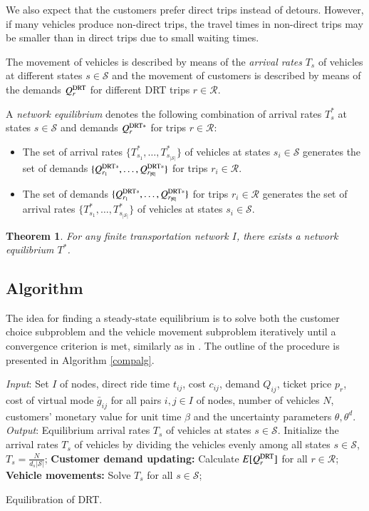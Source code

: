 \documentclass[dissertation,draft*]{aaltoseries}
\newtheorem{theorem}{Theorem}
\begin{document}
We also expect that the customers prefer direct trips instead of detours.
However, if many vehicles produce non-direct trips, 
the travel times in non-direct trips may be smaller than in direct trips due 
to small waiting times.

The movement of vehicles is described by means of the \emph{arrival rates} $T_s$ 
of vehicles at different states $s \in \mathcal{S}$ and
the movement of customers is described by means of the demands $Q^{\rm DRT}_r$ 
for different DRT trips $r \in \mathcal{R}$. 

A \emph{network equilibrium} denotes the following combination of
arrival rates $T_s^*$ at states $s \in \mathcal{S}$ and demands $Q_r^{{\rm DRT}*}$ for trips $r \in \mathcal{R}$: 
\begin{itemize}
\item
The set of arrival rates $\{T_{s_1}^*,\ldots,T_{s_{|\mathcal{S}|}}^*\}$ of vehicles at states $s_i \in \mathcal{S}$ 
generates the set of demands $\{Q_{r_1}^{{\rm DRT}*},\ldots,Q_{r_{|\mathcal{R}|}}^{{\rm DRT}*}\}$ for trips $r_i \in \mathcal{R}$.
\item
The set of demands $\{Q_{r_1}^{{\rm DRT}*},\ldots,Q_{r_{|\mathcal{R}|}}^{{\rm DRT}*}\}$ for trips $r_i \in \mathcal{R}$
generates the set of arrival rates $\{T_{s_1}^*,\ldots,T_{s_{|\mathcal{S}|}}^*\}$ of vehicles at states $s_i \in \mathcal{S}$. 
\end{itemize}

\begin{theorem}
For any finite transportation network $I$, there exists a network equilibrium $T^*$.
\end{theorem}


\subsection{Algorithm}
\label{ratkaisu01}
The idea for finding a steady-state equilibrium is to solve 
both the customer choice subproblem and the vehicle movement subproblem iteratively 
until a convergence criterion is met, similarly as in \citep{yang2010}. 
The outline of the procedure is presented in Algorithm \ref{compalg}.

\begin{algorithm}[H]
\begin{algorithmic}
\STATE \emph{Input}: Set $I$ of nodes, direct ride time $t_{ij}$, cost $c_{ij}$, demand $Q_{ij}$,
ticket price $p_{r}$, cost of virtual mode $\bar{g}_{ij}$ 
for all pairs $i,j \in I$ of nodes, number of vehicles $N$, 
customers' monetary value for unit time $\beta$
and the uncertainty parameters $\theta,\theta^d$.
\STATE \emph{Output}: Equilibrium arrival rates $T_s$ of 
vehicles at states $s \in \mathcal{S}$.
\STATE Initialize the arrival rates $T_s$ of vehicles by dividing the vehicles
evenly among all states $s \in \mathcal{S}$, $T_{s} = \frac {N}{d_s |\mathcal{S}|}$; 
\REPEAT
\STATE \textbf{Customer demand updating:} Calculate $E[Q_{r}^{\rm DRT}]$ for all 
$r \in \mathcal{R}$;
\STATE \textbf{Vehicle movements:} Solve $T_s$ for all $s \in \mathcal{S}$;
\end{algorithmic}
\caption{Equilibration of DRT.}
\label{compalg}
\end{algorithm}
\end{document}
